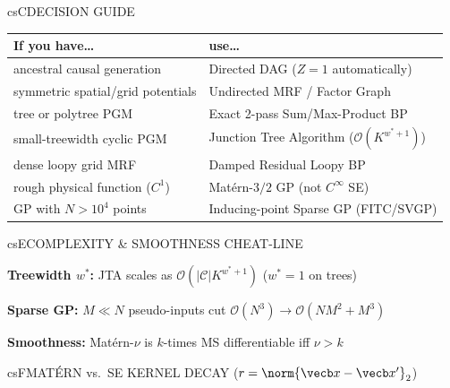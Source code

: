 \documentclass[../../../../master.tex]{subfiles}
\begin{document}
\begin{cscolumns}
\begin{cscard}{csC}{DECISION GUIDE}
  \renewcommand{\arraystretch}{1.2}\small
  \begin{tabular}{@{}>{\raggedright\arraybackslash}p{3.1cm}>{\raggedright\arraybackslash}p{4.6cm}@{}}
    \textbf{If you have\ldots} & \textbf{use\ldots}\\ \hline
    ancestral causal generation & Directed DAG ($Z=1$ automatically)\\
    symmetric spatial/grid potentials & Undirected MRF / Factor Graph\\
    tree or polytree PGM & Exact 2-pass Sum/Max-Product BP\\
    small-treewidth cyclic PGM & Junction Tree Algorithm ($\mathcal O(K^{w^*+1})$)\\
    dense loopy grid MRF & Damped Residual Loopy BP\\
    rough physical function ($C^1$) & Mat\'ern-$3/2$ GP (not $C^\infty$ SE)\\
    GP with $N > 10^4$ points & Inducing-point Sparse GP (FITC/SVGP)\\
  \end{tabular}
\end{cscard}

\begin{cscard}{csE}{COMPLEXITY \& SMOOTHNESS CHEAT-LINE}
  \begin{csbul}
    \item \textbf{Treewidth $w^*$:} JTA scales as $\mathcal O(|\mathcal C|K^{w^*+1})$ ($w^*=1$ on trees)
    \item \textbf{Sparse GP:} $M\ll N$ pseudo-inputs cut $\mathcal O(N^3)\to\mathcal O(NM^2+M^3)$
    \item \textbf{Smoothness:} Mat\'ern-$\nu$ is $k$-times MS differentiable iff $\nu > k$
  \end{csbul}
\end{cscard}

\begin{cscard}{csF}{MAT\'ERN vs.\ SE KERNEL DECAY ($r=\norm{\vecb x-\vecb x'}_2$)}
  \centering
\end{cscard}
\columnbreak


\end{cscolumns}
\end{document}
